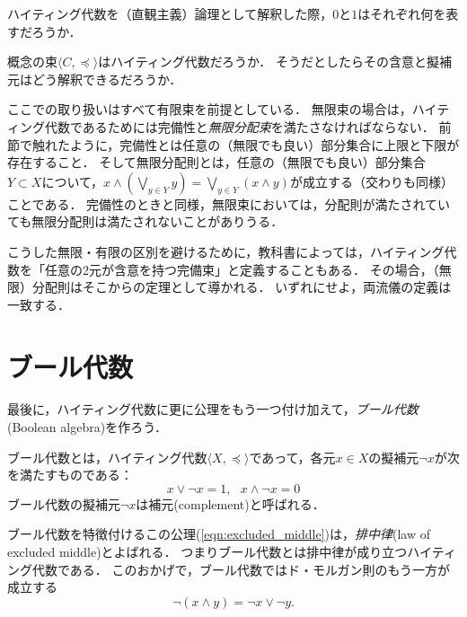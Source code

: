 \documentclass[11pt,a4paper]{jsarticle}
\begin{document}
\begin{exercise}
ハイティング代数を（直観主義）論理として解釈した際，$0$と$1$はそれぞれ何を表すだろうか．
\end{exercise}


\begin{example}
概念の束$\langle C, \preceq \rangle$はハイティング代数だろうか．
そうだとしたらその含意と擬補元はどう解釈できるだろうか．
\end{example}


\begin{develop}
ここでの取り扱いはすべて有限束を前提としている．
無限束の場合は，ハイティング代数であるためには完備性と\emph{無限分配束}を満たさなければならない．
前節で触れたように，完備性とは任意の（無限でも良い）部分集合に上限と下限が存在すること．
そして無限分配則とは，任意の（無限でも良い）部分集合$Y \subset X$について，$x \wedge (\bigvee_{y \in Y} y) = \bigvee_{y \in Y}(x \wedge y)$が成立する（交わりも同様）ことである．
完備性のときと同様，無限束においては，分配則が満たされていても無限分配則は満たされないことがありうる．

こうした無限・有限の区別を避けるために，教科書によっては，ハイティング代数を「任意の2元が含意を持つ完備束」と定義することもある．
その場合，（無限）分配則はそこからの定理として導かれる．
いずれにせよ，両流儀の定義は一致する．
\end{develop}

\section{ブール代数}
最後に，ハイティング代数に更に公理をもう一つ付け加えて，\emph{ブール代数}(Boolean algebra)を作ろう．

\begin{dfn}[ブール代数]
 ブール代数とは，ハイティング代数$\langle X, \preceq \rangle$であって，各元$x \in X$の擬補元$\neg x$が次を満たすものである：
\begin{equation}
 x \vee \neg x = 1, \ \ \ x \wedge \neg x = 0
\label{eqn:excluded_middle}
\end{equation}
ブール代数の擬補元$\neg x$は補元(complement)と呼ばれる．
\end{dfn}
ブール代数を特徴付けるこの公理(\ref{eqn:excluded_middle})は，\emph{排中律}(law of excluded middle)とよばれる．
つまりブール代数とは排中律が成り立つハイティング代数である．
このおかげで，ブール代数ではド・モルガン則のもう一方が成立する
\begin{equation}
 \neg (x \wedge y) = \neg x \vee \neg y.
\end{equation}
 
\end{document}
